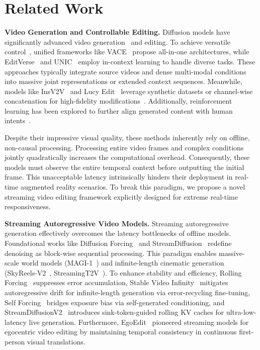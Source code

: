 



\section{Related Work}
\label{sec:related_work}

\noindent \textbf{Video Generation and Controllable Editing.}
\label{subsec:video_editing}
Diffusion models have significantly advanced video generation~\cite{singer2022make,blattmann2023stable,yang2024cogvideox, ma2026group, ma2024followpose, ma2025followcreation, ma2026fastvmt, ma2025followyourmotion} and editing. To achieve versatile control~\cite{ma2025controllable}, unified frameworks like VACE~\cite{jiang2025vace} propose all-in-one architectures, while EditVerse~\cite{ju2025editverse} and UNIC~\cite{ye2025unic} employ in-context learning to handle diverse tasks. These approaches typically integrate source videos and dense multi-modal conditions into massive joint representations or extended context sequences. Meanwhile, models like InsV2V~\cite{cheng2023consistent} and Lucy Edit~\cite{decart2025lucyedit} leverage synthetic datasets or channel-wise concatenation for high-fidelity modifications~\cite{mokady2023null}. Additionally, reinforcement learning has been explored to further align generated content with human intents~\cite{black2023training}.

Despite their impressive visual quality, these methods inherently rely on offline, non-causal processing. Processing entire video frames and complex conditions jointly quadratically increases the computational overhead. Consequently, these models must observe the entire temporal context before outputting the initial frame. This unacceptable latency intrinsically hinders their deployment in real-time augmented reality scenarios. To break this paradigm, we propose a novel streaming video editing framework explicitly designed for extreme real-time responsiveness.

\noindent \textbf{Streaming Autoregressive Video Models.}
\label{subsec:streaming_models}
Streaming autoregressive generation effectively overcomes the latency bottlenecks of offline models. Foundational works like Diffusion Forcing~\cite{chen2024diffusion} and StreamDiffusion~\cite{kodaira2025streamdiffusion} redefine denoising as block-wise sequential processing. This paradigm enables massive-scale world models (MAGI-1~\cite{teng2025magi}) and infinite-length cinematic generation (SkyReels-V2~\cite{chen2025skyreels}, StreamingT2V~\cite{henschel2025streamingt2v}). To enhance stability and efficiency, Rolling Forcing~\cite{liu2025rolling} suppresses error accumulation, Stable Video Infinity~\cite{li2025stable} mitigates autoregressive drift for infinite-length generation via error-recycling fine-tuning, Self Forcing~\cite{huang2025self} bridges exposure bias via self-generated conditioning, and StreamDiffusionV2~\cite{feng2025streamdiffusionv2} introduces sink-token-guided rolling KV caches for ultra-low-latency live generation. Furthermore, EgoEdit~\cite{li2025egoedit} pioneered streaming models for egocentric video editing by maintaining temporal consistency in continuous first-person visual translations.

